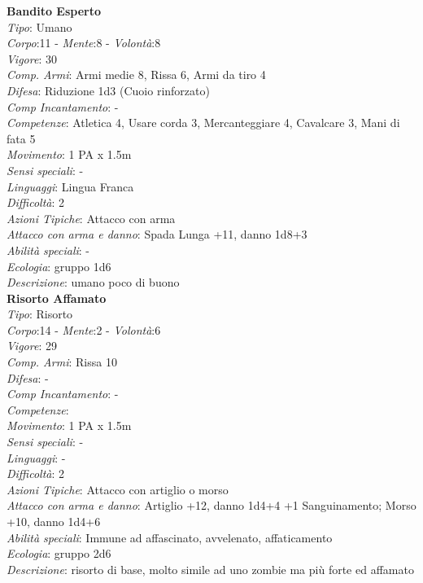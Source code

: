\documentclass[12pt,a4paper,twoside,openany]{book}
\begin{document}
\begin{multicols}{2}


\textbf{Bandito Esperto}\\
\textit{Tipo}: Umano\\
\textit{Corpo}:11 - \textit{Mente}:8 - \textit{Volontà}:8\\
\textit{Vigore}:  30 \\ %
\textit{Comp. Armi}: Armi medie 8, Rissa 6, Armi da tiro 4\\
\textit{Difesa}: Riduzione 1d3 (Cuoio rinforzato)\\
\textit{Comp Incantamento}: -\\
\textit{Competenze}: Atletica 4, Usare corda 3, Mercanteggiare 4, Cavalcare 3, Mani di fata 5\\
\textit{Movimento}: 1 PA x 1.5m\\
\textit{Sensi speciali}: -\\
\textit{Linguaggi}: Lingua Franca\\
\textit{Difficoltà}: 2\\
\textit{Azioni Tipiche}: Attacco con arma\\
\textit{Attacco con arma e danno}: Spada Lunga +11, danno 1d8+3\\
\textit{Abilità speciali}: -\\
\textit{Ecologia}: gruppo 1d6\\
\textit{Descrizione}: umano poco di buono\\

\textbf{Risorto Affamato}\\
\textit{Tipo}: Risorto\\
\textit{Corpo}:14 - \textit{Mente}:2 - \textit{Volontà}:6\\
\textit{Vigore}:  29 \\ %
\textit{Comp. Armi}: Rissa 10\\
\textit{Difesa}: -\\
\textit{Comp Incantamento}: -\\
\textit{Competenze}: \\
\textit{Movimento}: 1 PA x 1.5m\\
\textit{Sensi speciali}: -\\
\textit{Linguaggi}: -\\
\textit{Difficoltà}: 2\\
\textit{Azioni Tipiche}: Attacco con artiglio o morso\\
\textit{Attacco con arma e danno}: Artiglio +12, danno 1d4+4 +1 Sanguinamento; Morso +10, danno 1d4+6\\
\textit{Abilità speciali}: Immune ad affascinato, avvelenato, affaticamento	\\
\textit{Ecologia}: gruppo 2d6\\
\textit{Descrizione}: risorto di base, molto simile ad uno zombie ma più forte ed affamato\\


\end{multicols}
\end{document}
